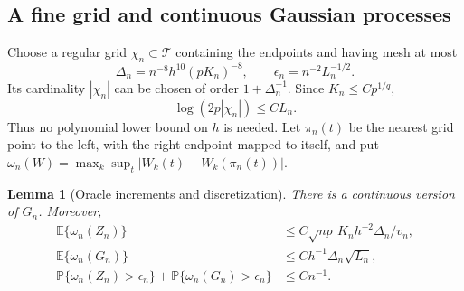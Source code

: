 \documentclass[10pt]{book}
\newtheorem{lemma}{Lemma}
\newcommand{\expect}{\mathbb{E}}
\newcommand{\prob}{\mathbb{P}}
\numberwithin{equation}{section}
\begin{document}
\subsection{A fine grid and continuous Gaussian processes}

Choose a regular grid $\chi_n\subset\mathcal T$ containing the endpoints
and having mesh at most
\[
 \Delta_n=n^{-8}h^{10}(pK_n)^{-8},\qquad
 \epsilon_n=n^{-2}L_n^{-1/2}.
\]
Its cardinality $|\chi_n|$ can be chosen of order $1+\Delta_n^{-1}$.
Since $K_n\le Cp^{1/q}$,
\begin{equation}
 \log(2p|\chi_n|)\le CL_n.
 \label{eq:hd-grid-size}
\end{equation}
Thus no polynomial lower bound on $h$ is needed. Let $\pi_n(t)$ be the
nearest grid point to the left, with the right endpoint mapped to itself,
and put
$\omega_n(W)=\max_k\sup_t|W_k(t)-W_k(\pi_n(t))|$.

\begin{lemma}[Oracle increments and discretization]
\label{lem:hd-grid}
There is a continuous version of $G_n$. Moreover,
\begin{align}
 \expect\{\omega_n(Z_n)\}&\le
 C\sqrt{np}\,K_n h^{-2}\Delta_n/v_n,\label{eq:hd-score-grid-mean}\\
 \expect\{\omega_n(G_n)\}&\le
 Ch^{-1}\Delta_n\sqrt{L_n},\label{eq:hd-gaussian-grid-mean}\\
 \prob\{\omega_n(Z_n)>\epsilon_n\}
 +\prob\{\omega_n(G_n)>\epsilon_n\}&\le Cn^{-1}.
 \label{eq:hd-oracle-grid-prob}
\end{align}
\end{lemma}
\end{document}
